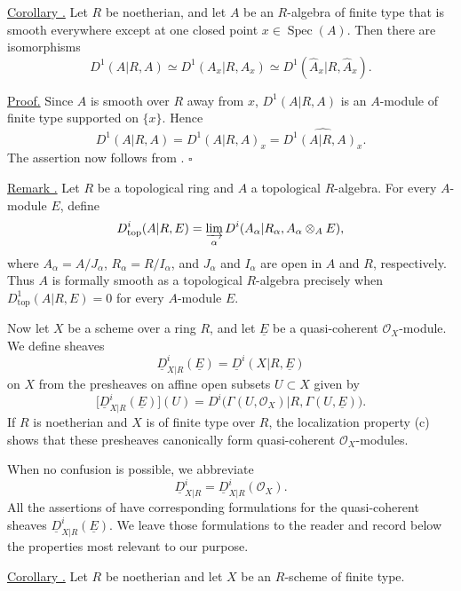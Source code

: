 
\underline{Corollary .}
Let $R$ be noetherian, and let $A$ be an $R$-algebra of finite type
that is smooth everywhere except at one closed point
$x\in\operatorname{Spec}(A)$. Then there are isomorphisms
\[
 D^1(A|R,A)\simeq D^1(A_x|R,A_x)
 \simeq D^1(\widehat A_x|R,\widehat A_x).
\]

\underline{Proof.}
Since $A$ is smooth over $R$ away from $x$,
$D^1(A|R,A)$ is an $A$-module of finite type supported on
$\{x\}$. Hence
\[
 D^1(A|R,A)=D^1(A|R,A)_x
 =\widehat{D^1(A|R,A)_x}.
\]
The assertion now follows from .
\hfill$\square$

\underline{Remark .}
Let $R$ be a topological ring and $A$ a topological $R$-algebra.
For every $A$-module $E$, define
\[
 D^i_{\mathrm{top}}(A|R,E)
 =\varinjlim_\alpha
 D^i(A_\alpha|R_\alpha,A_\alpha\otimes_AE),
\]
where $A_\alpha=A/J_\alpha$, $R_\alpha=R/I_\alpha$, and
$J_\alpha$ and $I_\alpha$ are open in $A$ and $R$, respectively.
Thus $A$ is formally smooth as a topological $R$-algebra precisely
when $D^1_{\mathrm{top}}(A|R,E)=0$ for every $A$-module $E$.

Now let $X$ be a scheme over a ring $R$, and let $\underline E$ be a
quasi-coherent $\mathcal O_X$-module. We define sheaves
\[
 \underline D^i_{X|R}(\underline E)
 =\underline D^i(X|R,\underline E)
\]
on $X$ from the presheaves on affine open subsets $U\subset X$
given by
\[
 \bigl[\underline D^i_{X|R}(\underline E)\bigr](U)
 =D^i\bigl(\Gamma(U,\mathcal O_X)|R,
            \Gamma(U,\underline E)\bigr).
\]
If $R$ is noetherian and $X$ is of finite type over $R$, the
localization property (c) shows that these presheaves canonically
form quasi-coherent $\mathcal O_X$-modules.

When no confusion is possible, we abbreviate
\[
 \underline D^i_{X|R}
 =\underline D^i_{X|R}(\mathcal O_X).
\]
All the assertions of  have corresponding formulations for the
quasi-coherent sheaves $\underline D^i_{X|R}(\underline E)$. We leave
those formulations to the reader and record below the properties
most relevant to our purpose.

\underline{Corollary .}
Let $R$ be noetherian and let $X$ be an $R$-scheme of finite type.


